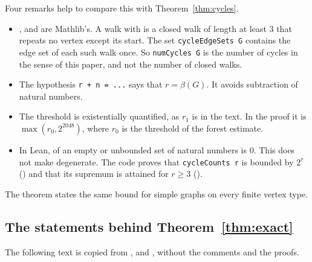 Four remarks help to compare this with Theorem~\ref{thm:cycles}.
\begin{itemize}
\item {},  and  are Mathlib's. A walk with 
is a closed walk of length at least $3$ that repeats no vertex except its start. The set
\texttt{cycleEdgeSets G} contains the edge set of each such walk once. So \texttt{numCycles G} is the
number of cycles in the sense of this paper, and not the number of closed walks.
\item The hypothesis \texttt{r + n = ...} says that $r=\beta(G)$. It avoids subtraction of natural
numbers.
\item The threshold is existentially quantified, as $r_1$ is in the text. In the proof it is
$\max(r_0,2^{2048})$, where $r_0$ is the threshold of the forest estimate.
\item In Lean,  of an empty or unbounded set of natural numbers is $0$. This does not
make  degenerate. The code proves that \texttt{cycleCounts r} is bounded by $2^{r}$
() and that its supremum is attained for $r\ge3$ ().
\end{itemize}
The theorem  states the same bound for simple graphs on every
finite vertex type.

\subsection{The statements behind Theorem~\ref{thm:exact}}

The following text is copied from ,
 and , without the comments and the proofs.

